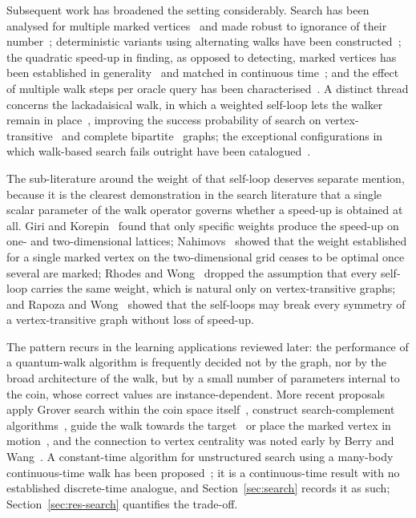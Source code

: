 Subsequent work has broadened the setting considerably. Search has been analysed
for multiple marked vertices~\cite{A_2021, bezerra2021quantum} and made robust
to ignorance of their number~\cite{Xu_2021a}; deterministic variants using
alternating walks have been constructed~\cite{Marsh_2021}; the quadratic
speed-up in finding, as opposed to detecting, marked vertices has been
established in generality~\cite{Ambainis_2019} and matched in continuous
time~\cite{Apers_2021}; and the effect of multiple walk steps per oracle query
has been characterised~\cite{wong2015quantum}. A distinct thread concerns the
lackadaisical walk, in which a weighted self-loop lets the walker remain in
place~\cite{G_2018}, improving the success probability of search on
vertex-transitive~\cite{Rhodes_2020} and complete bipartite~\cite{Rhodes_2018}
graphs; the exceptional configurations in which walk-based search fails outright
have been catalogued~\cite{Wong_2017a}.

The sub-literature around the weight of that self-loop deserves separate
mention, because it is the clearest demonstration in the search literature that
a single scalar parameter of the walk operator governs whether a speed-up is
obtained at all. Giri and Korepin~\cite{Giri_2020} found that only specific
weights produce the speed-up on one- and two-dimensional lattices;
Nahimovs~\cite{Nahimovs_2018} showed that the weight established for a single
marked vertex on the two-dimensional grid ceases to be optimal once several are
marked; Rhodes and Wong~\cite{Rhodes_2019} dropped the assumption that every
self-loop carries the same weight, which is natural only on vertex-transitive
graphs; and Rapoza and Wong~\cite{Rapoza_2021} showed that the self-loops may
break every symmetry of a vertex-transitive graph without loss of speed-up.

The pattern recurs in the learning applications reviewed later: the performance
of a quantum-walk algorithm is frequently decided not by the graph, nor by the
broad architecture of the walk, but by a small number of parameters internal to
the coin, whose correct values are instance-dependent. More recent proposals
apply Grover search within the coin space itself~\cite{Giri_2023}, construct
search-complement algorithms~\cite{WingBocanegra_2025}, guide the walk towards
the target~\cite{Schulz_2024} or place the marked vertex in
motion~\cite{Sahu_2024}, and the connection to vertex centrality was noted early
by Berry and Wang~\cite{Berry_2010}. A constant-time algorithm for unstructured
search using a many-body continuous-time walk has been
proposed~\cite{DalFavero_2024}; it is a continuous-time result with no
established discrete-time analogue, and Section~\ref{sec:search} records it
as such; Section~\ref{sec:res-search} quantifies the trade-off.

